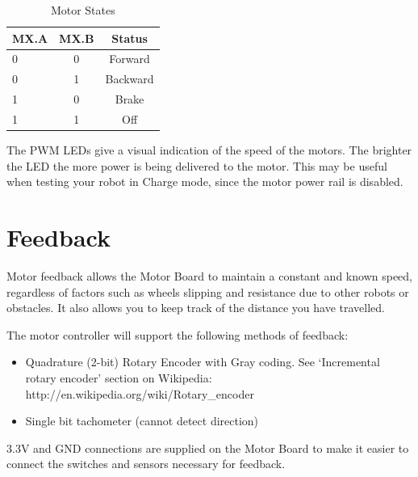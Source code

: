 \documentclass[a4paper]{article}
\begin{document}
\begin{table}[h]
	\caption{\label{tab:statusleds}Motor States}
	\begin{center}
		\begin{tabular}{|l|c|c|}
			\hline
			MX.A & MX.B & Status \\ 
			\hline
			0 & 0 & Forward \\
			0 & 1 & Backward \\
			1 & 0 & Brake \\
			1 & 1 & Off \\
			\hline		
		\end{tabular}
	\end{center}
\end{table}

The PWM LEDs give a visual indication of the speed of the motors. The brighter the LED the more power is being delivered to the motor. This may be useful when testing your robot in Charge mode, since the motor power rail is disabled.


\section{Feedback}
Motor feedback allows the Motor Board to maintain a constant and known speed, regardless of factors such as wheels slipping and resistance due to other robots or obstacles. It also allows you to keep track of the distance you have travelled.  

\vspace{12pt}


\vspace{12pt}

The motor controller will support the following methods of feedback:
\begin{itemize}
\item Quadrature (2-bit) Rotary Encoder with Gray coding. See `Incremental rotary encoder' section on Wikipedia:  http://en.wikipedia.org/wiki/Rotary\_encoder
\item Single bit tachometer (cannot detect direction) 
\end{itemize} 

3.3V and GND connections are supplied on the Motor Board to make it easier to connect the switches and sensors necessary for feedback.

\vspace{12pt}

\end{document}
